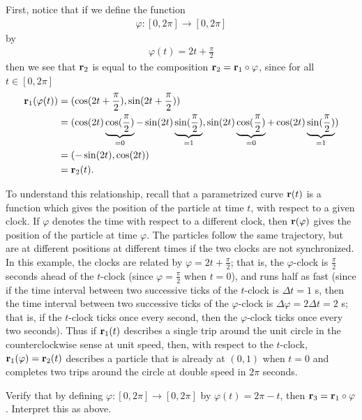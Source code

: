 \documentclass[12pt,letterpaper,reqno]{article}
\numberwithin{equation}{section}
\newcommand{\bbr}{{\bf r}}
\begin{document}
{First, notice that if we define the function
\begin{align*}
	\varphi:[0,2\pi] \to [0,2\pi]
\end{align*}
by 
\begin{align*}
	\varphi(t)=2t+\frac{\pi}{2}
\end{align*}
then we see that $\bbr_2$ is equal to the composition $\bbr_2=\bbr_1 \circ \varphi$, since for all $t \in [0,2\pi]$
\begin{align*}
	\bbr_1(\varphi(t))&=(\cos(2t+\frac{\pi}{2}),\sin(2t+\frac{\pi}{2})) \\
	&=(\cos(2t)\underbrace{\cos(\frac{\pi}{2})}_{=0}-\sin(2t)\underbrace{\sin(\frac{\pi}{2})}_{=1}, \sin(2t)\underbrace{\cos(\frac{\pi}{2})}_{=0}+\cos(2t)\underbrace{\sin(\frac{\pi}{2})}_{=1}) \\
	&=(-\sin(2t),\cos(2t)) \\
	&=\bbr_2(t).
\end{align*}

To understand this relationship, recall that a parametrized curve $\bbr(t)$ is a function which gives the position of the particle at time $t$, with respect to a given clock. If $\varphi$ denotes the time with respect to a different clock, then $\bbr(\varphi)$ gives the position of the particle at time $\varphi$. The particles follow the same trajectory, but are at different positions at different times if the two clocks are not synchronized. In this example, the clocks are related by $\varphi=2t+\frac{\pi}{2}$; that is, the $\varphi$-clock is $\frac{\pi}{2}$ seconds ahead of the $t$-clock (since $\varphi=\frac{\pi}{2}$ when $t=0$), and runs half as fast (since if the time interval between two successive ticks of the $t$-clock is $\Delta t=1$ s, then the time interval between two successive ticks of the $\varphi$-clock is  $\Delta \varphi=2\Delta t=2$ s; that is, if the $t$-clock ticks once every second, then the $\varphi$-clock ticks once every two seconds). Thus if $\bbr_1(t)$ describes a single trip around the unit circle in the counterclockwise sense at unit speed, then, with respect to the $t$-clock, $\bbr_1(\varphi)=\bbr_2(t)$ describes a particle that is already at $(0,1)$ when $t=0$ and completes two trips around the circle at double speed in $2\pi$ seconds.

\begin{exercise}\label{ex:orient_reve}
Verify that by defining $\varphi:[0,2\pi] \to [0,2\pi]$ by $\varphi(t)=2\pi-t$, then $\bbr_3=\bbr_1 \circ \varphi$. Interpret this as above.	
\end{exercise}

}
\end{document}
